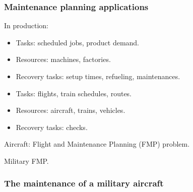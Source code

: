 \begin{frame}
\frametitle{\textbf{Maintenance planning applications}}

  In production:
  \begin{itemize}[<+->]
    \item Tasks: scheduled jobs, product demand.
    \item Resources: machines, factories.
    \item Recovery tasks: setup times, refueling, maintenances.
  \end{itemize}  
  \pause
  \begin{itemize}[<+->]
    \item Tasks: flights, train schedules, routes.
    \item Resources: aircraft, trains, vehicles.
    \item Recovery tasks: checks.
  \end{itemize}

  \pause
  Aircraft: Flight and Maintenance Planning (FMP) problem.

  \pause
  Military FMP.

\end{frame}

\begin{frame}
\frametitle{\textbf{The maintenance of a military aircraft}}
  \begin{tikzpicture}
    
  \end{tikzpicture}
\end{frame}

